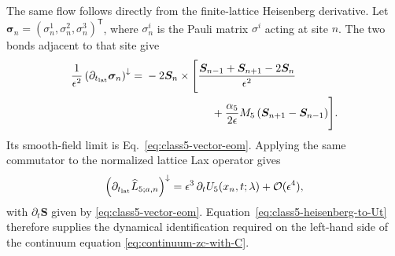 The same flow follows directly from the finite-lattice Heisenberg derivative.
Let $\boldsymbol\sigma_n=(\sigma_n^1,\sigma_n^2,\sigma_n^3)^{\mathsf T}$,
where $\sigma_n^i$ is the Pauli matrix $\sigma^i$ acting at site $n$.
The two bonds adjacent to that site give
\begin{align}
\frac{1}{\epsilon^2}
\left(\partial_{t_{\rm lat}}\boldsymbol\sigma_n\right)^\downarrow
={}&-2\boldsymbol S_n\times\Biggl[
\frac{\boldsymbol S_{n-1}+\boldsymbol S_{n+1}-2\boldsymbol S_n}
{\epsilon^2}
\nonumber\\
&\hspace{6em}
+\frac{\alpha_5}{2\epsilon}M_5
\left(\boldsymbol S_{n+1}-\boldsymbol S_{n-1}\right)
\Biggr].
\label{eq:class5-finite-lattice-spin-flow}
\end{align}
Its smooth-field limit is Eq.~\eqref{eq:class5-vector-eom}.
Applying the same commutator to the normalized lattice Lax operator gives
\begin{equation}
\left(
\partial_{t_{\rm lat}}\widehat L_{5;a,n}
\right)^{\downarrow}
=
\epsilon^3\,\partial_tU_5(x_n,t;\lambda)
+\mathcal O(\epsilon^4),
\label{eq:class5-heisenberg-to-Ut}
\end{equation}
with $\partial_t\boldsymbol S$ given by
\eqref{eq:class5-vector-eom}.  Equation~\eqref{eq:class5-heisenberg-to-Ut}
therefore supplies the dynamical identification required on the left-hand
side of the continuum equation \eqref{eq:continuum-zc-with-C}.

